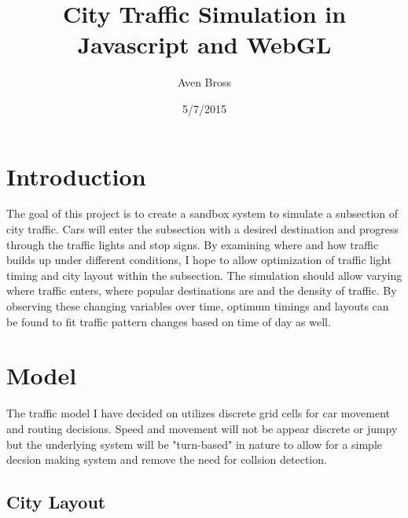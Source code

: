 \documentclass{article}
\title{City Traffic Simulation in Javascript and WebGL}
\author{Aven Bross}
\date{5/7/2015}
\begin{document}
\maketitle






%
%

\section{Introduction}

The goal of this project is to create a sandbox system to simulate a subsection of city traffic.  Cars will enter the subsection with a desired destination and progress through the traffic lights and stop signs. By examining where and how traffic builds up under different conditions, I hope to allow optimization of traffic light timing and city layout within the subsection.  The simulation should allow varying where traffic enters, where popular destinations are and the density of traffic. By observing these changing variables over time, optimum timings and layouts can be found to fit traffic pattern changes based on time of day as well.

\section{Model}

The traffic model I have decided on utilizes discrete grid cells for car movement and routing decisions.  Speed and movement will not be appear discrete or jumpy but the underlying system will be "turn-based" in nature to allow for a simple decsion making system and remove the need for collsion detection.

\subsection{City Layout}
\end{document}
